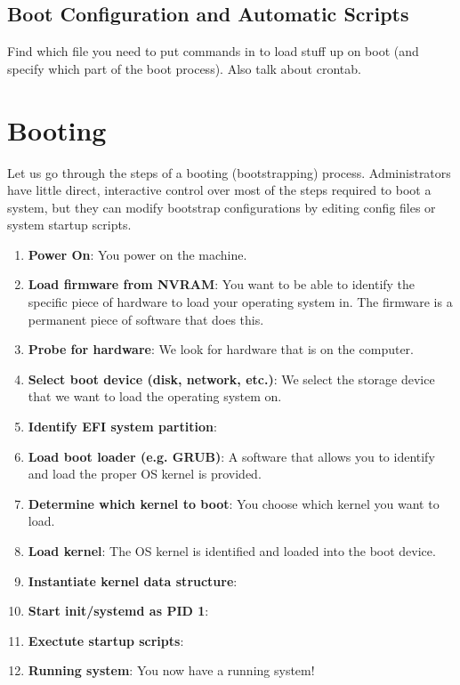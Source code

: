 \documentclass{article}
\theoremstyle{definition}
\begin{document}
  \subsection{Boot Configuration and Automatic Scripts}

    Find which file you need to put commands in to load stuff up on boot (and specify which part of the boot process). Also talk about crontab. 

\section{Booting}

  Let us go through the steps of a booting (bootstrapping) process. Administrators have little direct, interactive control over most of the steps required to boot a system, but they can modify bootstrap configurations by editing config files or system startup scripts. 

  \begin{enumerate}
    \item \textbf{Power On}: You power on the machine. 
    \item \textbf{Load firmware from NVRAM}: You want to be able to identify the specific piece of hardware to load your operating system in. The firmware is a permanent piece of software that does this. 
    \item \textbf{Probe for hardware}: We look for hardware that is on the computer. 
    \item \textbf{Select boot device (disk, network, etc.)}: We select the storage device that we want to load the operating system on. 
    \item \textbf{Identify EFI system partition}: 
    \item \textbf{Load boot loader (e.g. GRUB)}: A software that allows you to identify and load the proper OS kernel is provided. 
    \item \textbf{Determine which kernel to boot}: You choose which kernel you want to load.  
    \item \textbf{Load kernel}: The OS kernel is identified and loaded into the boot device. 
    \item \textbf{Instantiate kernel data structure}: 
    \item \textbf{Start init/systemd as PID 1}: 
    \item \textbf{Exectute startup scripts}:
    \item \textbf{Running system}: You now have a running system! 
  \end{enumerate}
\end{document}
